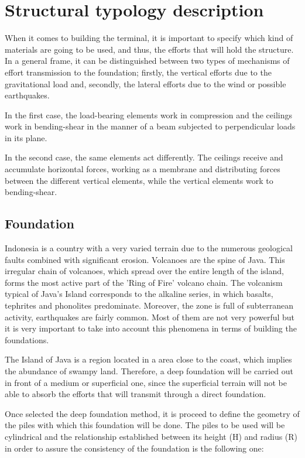 \chapter{Structural typology description}
When it comes to building the terminal, it is important to specify which kind of materials are going to be used, and thus, the efforts that will hold the structure. In a general frame, it can be distinguished between two types of mechanisms of effort transmission to the foundation; firstly, the vertical efforts due to the gravitational load and, secondly, the lateral efforts due to the wind or possible earthquakes.

In the first case, the load-bearing elements work in compression and the ceilings work in bending-shear in the manner of a beam subjected to perpendicular loads in its plane.

In the second case, the same elements act differently. The ceilings receive and accumulate horizontal forces, working as a membrane and distributing forces between the different vertical elements, while the vertical elements work to bending-shear.

	\section{Foundation}
Indonesia is a country with a very varied terrain due to the numerous geological faults combined with significant erosion. Volcanoes are the spine of Java. This irregular chain of volcanoes, which spread over the entire length of the island, forms the most active part of the 'Ring of Fire' volcano chain. The volcanism typical of Java's Island corresponds to the alkaline series, in which basalts, tephrites and phonolites predominate. Moreover, the zone is full of subterranean activity, earthquakes are fairly common. Most of them are not very powerful but it is very important to take into account this phenomena in terms of building the foundations.

The Island of Java is a region located in a area close to the coast, which implies the abundance of swampy land. Therefore, a deep foundation will be carried out in front of a medium or superficial one, since the superficial terrain will not be able to absorb the efforts that will transmit through a direct foundation.

Once selected the deep foundation method, it is proceed to define the geometry of the piles with which this foundation will be done. The piles to be used will be cylindrical and the relationship established between its height (H) and radius (R) in order to assure the consistency of the foundation is the following one:

